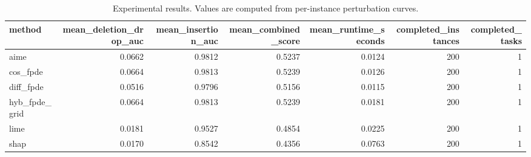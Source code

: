\begin{table}[t]
\caption{Experimental results. Values are computed from per-instance perturbation curves.}
\label{tab:main_results_computed}
\centering
\begin{tabular}{lrrrrrr}
\toprule
method & mean\_deletion\_drop\_auc & mean\_insertion\_auc & mean\_combined\_score & mean\_runtime\_seconds & completed\_instances & completed\_tasks \\
\midrule
aime & 0.0662 & 0.9812 & 0.5237 & 0.0124 & 200 & 1 \\
cos\_fpde & 0.0664 & 0.9813 & 0.5239 & 0.0126 & 200 & 1 \\
diff\_fpde & 0.0516 & 0.9796 & 0.5156 & 0.0115 & 200 & 1 \\
hyb\_fpde\_grid & 0.0664 & 0.9813 & 0.5239 & 0.0181 & 200 & 1 \\
lime & 0.0181 & 0.9527 & 0.4854 & 0.0225 & 200 & 1 \\
shap & 0.0170 & 0.8542 & 0.4356 & 0.0763 & 200 & 1 \\
\bottomrule
\end{tabular}

\end{table}
